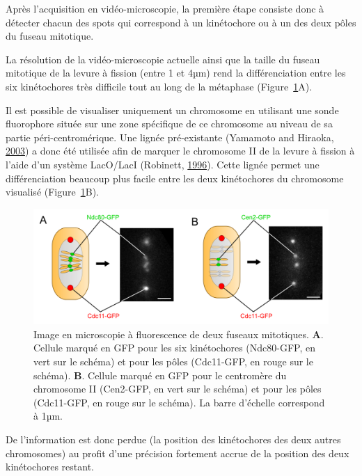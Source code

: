 \documentclass[12pt,a4paper,twoside,openright]{book}
\begin{document}
Après l'acquisition en vidéo-microscopie, la première étape consiste
donc à détecter chacun des spots qui correspond à un kinétochore ou à un
des deux pôles du fuseau mitotique.

La résolution de la vidéo-microscopie actuelle ainsi que la taille du
fuseau mitotique de la levure à fission (entre 1 et 4µm) rend la
différenciation entre les six kinétochores très difficile tout au long
de la métaphase (Figure~\ref{fig:spindle_peaks}A).

Il est possible de visualiser uniquement un chromosome en utilisant une
sonde fluorophore située sur une zone spécifique de ce chromosome au
niveau de sa partie péri-centromérique. Une lignée pré-existante
(Yamamoto and Hiraoka, \protect\hyperlink{ref-Yamamoto2003}{2003}) a
donc été utilisée afin de marquer le chromosome II de la levure à
fission à l'aide d'un système LacO/LacI (Robinett,
\protect\hyperlink{ref-Robinett1996}{1996}). Cette lignée permet une
différenciation beaucoup plus facile entre les deux kinétochores du
chromosome visualisé (Figure~\ref{fig:spindle_peaks}B).

\begin{figure}[htbp]
\centering
\includegraphics{figures/results/imaging/spindle_peaks.png}
\caption[Image en microscopie à fluorescence de deux fuseaux mitotique]{\label{fig:spindle_peaks}Image
en microscopie à fluorescence de deux fuseaux mitotiques. \textbf{A}.
Cellule marqué en GFP pour les six kinétochores (Ndc80-GFP, en vert sur
le schéma) et pour les pôles (Cdc11-GFP, en rouge sur le schéma).
\textbf{B}. Cellule marqué en GFP pour le centromère du chromosome II
(Cen2-GFP, en vert sur le schéma) et pour les pôles (Cdc11-GFP, en rouge
sur le schéma). La barre d'échelle correspond à 1µm.}
\end{figure}

De l'information est donc perdue (la position des kinétochores des deux
autres chromosomes) au profit d'une précision fortement accrue de la
position des deux kinétochores restant.
\end{document}
